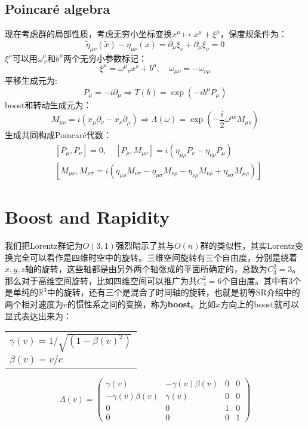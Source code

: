 \subsection{Poincar\'e algebra}
现在考虑群的局部性质，考虑无穷小坐标变换$x^\mu\mapsto x^\mu+\xi^\mu$，保度规条件为：
\begin{equation}
	\tilde{\eta}_{\mu\nu}(\tilde x)-\eta_{\mu\nu}(x)=\partial_\mu\xi_\nu+\partial_\mu\xi_\nu=0
\end{equation}
$\xi^\mu$可以用$\omega_{\ \nu}^\mu$和$b^\mu$两个无穷小参数标记：
\[\xi^\mu={\omega^\mu}_\nu x^\nu+b^\mu,\quad \omega_{\mu\nu}=-\omega_{\nu\mu}\]
平移生成元为:
\[P_\mu=-i\partial_\mu\Rightarrow T(b)=\exp(-i b^\mu P_\mu)\]
boost和转动生成元为：
\[M_{\mu\nu}=i\left(x_\mu\partial_\nu-x_\nu\partial_\mu\right)\Rightarrow \Lambda(\omega)=\exp(-\frac{i}{2} \omega^{\mu\nu} M_{\mu\nu})\]
生成共同构成Poincar\'e代数：
\begin{equation}
	\begin{aligned}
		&[P_\mu,P_\nu]=0,\quad[P_\rho,M_{\mu\nu}]=i(\eta_{\mu\rho}P_\nu-\eta_{\nu\rho} P_\mu)\\
		&[M_{\mu\nu},M_{\rho\sigma}=i\left(\eta_{\mu\rho}M_{\nu\sigma}-\eta_{\mu\sigma}M_{\nu\rho}-\eta_{\nu\rho}M_{\nu\rho}+\eta_{\nu\sigma}M_{\mu\rho}\right)]
	\end{aligned}
\end{equation}

\section{Boost and Rapidity}
我们把Lorentz群记为$O(3,1)$强烈暗示了其与$O(n)$群的类似性，其实Lorentz变换完全可以看作是四维时空中的旋转。三维空间旋转有三个自由度，分别是绕着$x,y,z$轴的旋转，这些轴都是由另外两个轴张成的平面所确定的，总数为$C_3^2=3$。那么对于高维空间旋转，比如四维空间可以推广为共$C_4^2=6$个自由度。其中有3个是单纯的$\mathbb{R}^3$中的旋转，还有三个是混合了时间轴的旋转，也就是初等SR介绍中的两个相对速度为$v$的惯性系之间的变换，称为\textbf{boost}。比如$x$方向上的boost就可以显式表达出来为：
\begin{margintable}\footnotesize 
	\begin{tabularx}{\marginparwidth}{|X}
		$\gamma(v)=1/\sqrt{(1-\beta(v)^2)}$\\
		$\beta(v)=v/c$
	\end{tabularx}
\end{margintable}
\begin{equation}
	\Lambda(v)=\begin{pmatrix}
		\gamma(v)&-\gamma(v)\beta(v)  &0  & 0\\
		-\gamma(v)\beta(v) & \gamma(v) &0  &0 \\
		0&0  & 1 &0 \\
		0&  0&  0&1
	\end{pmatrix}
\end{equation}

